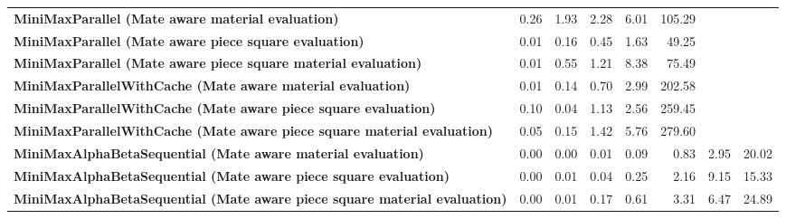 \begin{table}[H]
{\begin{tabular}{|p{8cm}|*{7}{r|}}
            \rowcolor[HTML]{FFFFFF}
            \textbf{MiniMaxParallel (Mate aware material evaluation)}                                  & 0.26                                  & 1.93                                  & 2.28                                  & 6.01                                  & 105.29 &  &  \\
            \rowcolor[HTML]{EFEFEF}
            \textbf{MiniMaxParallel (Mate aware piece square evaluation)}                              & 0.01                                  & 0.16                                  & 0.45                                  & 1.63 & 49.25 &  &  \\
            \rowcolor[HTML]{FFFFFF}
            \textbf{MiniMaxParallel (Mate aware piece square material evaluation)}                     & 0.01                                  & 0.55 & 1.21 & 8.38 & 75.49 &  &  \\

            \rowcolor[HTML]{EFEFEF}
            \textbf{MiniMaxParallelWithCache (Mate aware material evaluation)}                         & 0.01                                  & 0.14                                  & 0.70 & 2.99 & 202.58 &  &  \\
            \rowcolor[HTML]{FFFFFF}
            \textbf{MiniMaxParallelWithCache (Mate aware piece square evaluation)}                     & 0.10                                  & 0.04 & 1.13 & 2.56 & 259.45 &  &  \\
            \rowcolor[HTML]{EFEFEF}
            \textbf{MiniMaxParallelWithCache (Mate aware piece square material evaluation)}            & 0.05 & 0.15 & 1.42 & 5.76 & 279.60 &  &  \\

            \rowcolor[HTML]{FFFFFF}
            \textbf{MiniMaxAlphaBetaSequential (Mate aware material evaluation)}                       & 0.00                                  & 0.00                                  & 0.01 & 0.09 & 0.83 & 2.95 & 20.02 \\
            \rowcolor[HTML]{EFEFEF}
            \textbf{MiniMaxAlphaBetaSequential (Mate aware piece square evaluation)}                   & 0.00                                  & 0.01 & 0.04 & 0.25 & 2.16 & 9.15 & 15.33 \\
            \rowcolor[HTML]{FFFFFF}
            \textbf{MiniMaxAlphaBetaSequential (Mate aware piece square material evaluation)}               & 0.00 & 0.01 & 0.17 & 0.61 & 3.31 & 6.47 & 24.89 \\


\end{tabular}}
\end{table}
